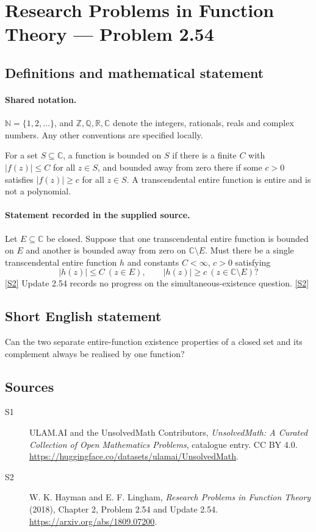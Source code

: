 \documentclass[11pt]{article}
\newcommand{\sref}[2]{\hyperlink{source:#1:#2}{[S#2]}}
\begin{document}
\section{Research Problems in Function Theory — Problem 2.54}\label{statement}

\subsection{Definitions and mathematical statement}

\paragraph{Shared notation.}$\mathbb N=\{1,2,\ldots\}$, and $\mathbb Z,\mathbb Q,\mathbb R,\mathbb C$ denote the integers, rationals, reals and complex numbers. Any other conventions are specified locally.


For a set $S\subseteq\mathbb C$, a function is bounded on $S$ if there is a finite $C$ with $|f(z)|\le C$ for all $z\in S$, and bounded away from zero there if some $c>0$ satisfies $|f(z)|\ge c$ for all $z\in S$. A transcendental entire function is entire and is not a polynomial.

\paragraph{Statement recorded in the supplied source.}
Let $E\subseteq\mathbb C$ be closed. Suppose that one transcendental entire function is bounded on $E$ and another is bounded away from zero on $\mathbb C\setminus E$.
Must there be a single transcendental entire function $h$ and constants $C<\infty$, $c>0$ satisfying
\[|h(z)|\le C\ (z\in E),\qquad |h(z)|\ge c\ (z\in\mathbb C\setminus E)?\] \sref{statement}{2}
Update 2.54 records no progress on the simultaneous-existence question. \sref{statement}{2}
\subsection{Short English statement}
Can the two separate entire-function existence properties of a closed set and its complement always be realised by one function?
\subsection{Sources}
\begin{description}
\item[\hypertarget{source:statement:1}{S1}] ULAM.AI and the UnsolvedMath Contributors, \emph{UnsolvedMath: A Curated Collection of Open Mathematics Problems}, catalogue entry. CC BY 4.0. \url{https://huggingface.co/datasets/ulamai/UnsolvedMath}.
\item[\hypertarget{source:statement:2}{S2}] W. K. Hayman and E. F. Lingham, \emph{Research Problems in Function Theory} (2018), Chapter 2, Problem 2.54 and Update 2.54. \url{https://arxiv.org/abs/1809.07200}.
\end{description}
\label{end:statement}
\end{document}
